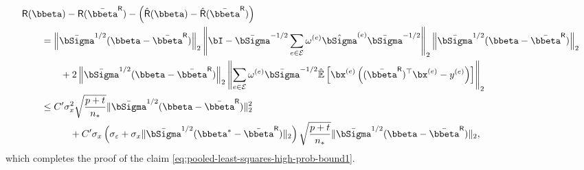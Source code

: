 \documentclass[10pt]{article}
\numberwithin{equation}{section}
\begin{document}
\begin{align*}
&\mathsf{R}(\bbeta) - \mathsf{R}(\bar{\bbeta}^{\mathsf{R}}) - \left(\hat{\mathsf{R}}(\bbeta) - \hat{\mathsf{R}}(\bar{\bbeta}^{\mathsf{R}}) \right) \\
    &~~~~~~ = \left\|\bar{\bSigma}^{1/2}(\bbeta - \bar{\bbeta}^{\mathsf{R}})\right\|_2 \left\|\bI - \bar{\bSigma}^{-1/2} \sum_{e\in \mathcal{E}} \omega^{(e)}\hat{\bSigma}^{(e)} \bar{\bSigma}^{-1/2} \right\|_2 \left\|\bar{\bSigma}^{1/2}(\bbeta - \bar{\bbeta}^{\mathsf{R}})\right\|_2 \\
    &~~~~~~~~~~~~ + 2\left\|\bar{\bSigma}^{1/2}(\bbeta - \bar{\bbeta}^{\mathsf{R}})\right\|_2 \left\|\sum_{e\in \mathcal{E}} \omega^{(e)} \bar{\bSigma}^{-1/2} \hat{\mathbb{E}} \left[\bx^{(e)} \left((\bar{\bbeta}^{\mathsf{R}})^\top \bx^{(e)} - y^{(e)}\right)\right]\right\|_2 \\
    &~~~~~~ \le C' \sigma_x^2 \sqrt{\frac{p+t}{n_*}} \|\bar{\bSigma}^{1/2}(\bbeta - \bar{\bbeta}^{\mathsf{R}})\|_2^2  \\
    &~~~~~~~~~~~~~~~ + C'\sigma_x \left(\sigma_\varepsilon + \sigma_x\|\bar{\bSigma}^{1/2}(\bbeta^* - \bar{\bbeta}^{\mathsf{R}})\|_2 \right) \sqrt{\frac{p+t}{n_*}} \|\bar{\bSigma}^{1/2}(\bbeta - \bar{\bbeta}^{\mathsf{R}})\|_2,
\end{align*} which completes the proof of the claim \eqref{eq:pooled-least-squares-high-prob-bound1}.
\end{document}
